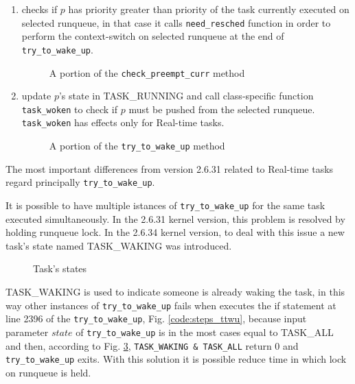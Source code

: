 \begin{enumerate}
\item checks if $p$ has priority greater than priority of the task currently
executed on selected runqueue, in that case it calls \texttt{need\_resched}
function in order to perform the context-switch on selected runqueue at the
end of \texttt{try\_to\_wake\_up}.

\begin{figure}[h]
  \lstset{basicstyle=\footnotesize, language=c, captionpos=b, frame=single,label=lis:steps}
  
  \label{code:prio_ttwu}
  \caption{A portion of the \texttt{check\_preempt\_curr} method}
\end{figure}

\item update $p$'s state in TASK\_RUNNING and call class-specific function 
\texttt{task\_woken} to check if $p$ must be pushed from the selected runqueue.
\texttt{task\_woken} has effects only for Real-time tasks.

\begin{figure}[h]
  \lstset{basicstyle=\footnotesize, language=c, captionpos=b, frame=single,label=lis:steps}
  
  \label{code:final_ttwu}
  \caption{A portion of the \texttt{try\_to\_wake\_up} method}
\end{figure}

\end{enumerate}

The most important differences from version 2.6.31 related to Real-time tasks regard principally \texttt{try\_to\_wake\_up}.

It is possible to have multiple istances of \texttt{try\_to\_wake\_up} for the same task executed simultaneously. In the 2.6.31 kernel version, this problem
is resolved by holding runqueue lock. In the 2.6.34 kernel version, to deal with this issue a new task's state named TASK\_WAKING was introduced. 

\begin{figure}[h]
  \lstset{basicstyle=\footnotesize, language=c, captionpos=b, frame=single,label=lis:steps}
  
  \label{code:task_states}
  \caption{Task's states}
\end{figure}

TASK\_WAKING is used to indicate someone is already waking the task, in this way other instances of \texttt{try\_to\_wake\_up} fails when executes the if 
statement at line 2396 of the \texttt{try\_to\_wake\_up}, Fig. \ref{code:steps_ttwu}, because input parameter $state$ of \texttt{try\_to\_wake\_up} is in the 
most cases equal to TASK\_ALL and then, according to Fig. \ref{code:task_states}, \texttt{TASK\_WAKING \& TASK\_ALL} return 0 and 
\texttt{try\_to\_wake\_up} exits. With this solution it is possible reduce time in which lock on runqueue is held. 


